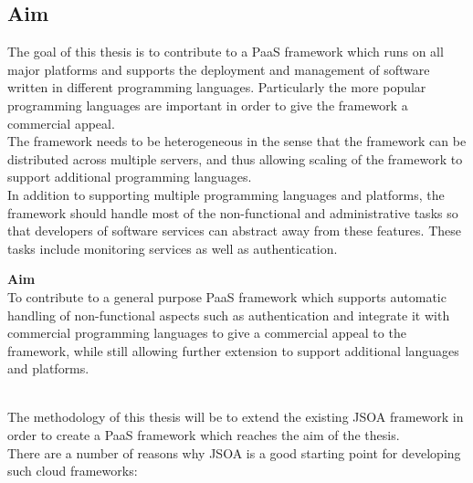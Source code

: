 \documentclass[12pt,a4paper]{article}
\begin{document}
\newpage
\subsection{Aim}\label{subsec:Aim}
The goal of this thesis is to contribute to a PaaS framework which runs on all major platforms and supports the deployment and management of software written in different programming languages. Particularly the more popular programming languages are important in order to give the framework a commercial appeal.\\
The framework needs to be heterogeneous in the sense that the framework can be distributed across multiple servers, and thus allowing scaling of the framework to support additional programming languages. \\
In addition to supporting multiple programming languages and platforms, the framework should handle most of the non-functional and administrative tasks so that developers of software services can abstract away from these features. These tasks include monitoring services as well as authentication. \\

\begin{mdframed}
\textbf{Aim}\\
To contribute to a general purpose PaaS framework which supports automatic handling of non-functional aspects such as authentication and integrate it with commercial programming languages to give a commercial appeal to the framework, while still allowing further extension to support additional languages and platforms.
\end{mdframed}

~\\
The methodology of this thesis will be to extend the existing JSOA\cite{jsoa_website} framework in order to create a PaaS framework which reaches the aim of the thesis.\\

There are a number of reasons why JSOA is a good starting point for developing such cloud frameworks: 
\end{document}
